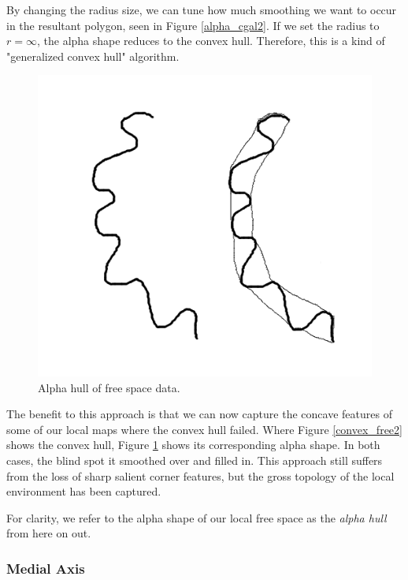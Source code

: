 By changing the radius size, we can tune how much smoothing we want to occur in the resultant polygon, seen in Figure \ref{alpha_cgal2}.  If we set the radius to $r = \infty$, the alpha shape reduces to the convex hull.  Therefore, this is a kind of "generalized convex hull" algorithm.

\begin{figure}
  \begin{center}
    \includegraphics[scale=0.9]{4_alpha_freespace2.png}
  \end{center}
  \caption{Alpha hull of free space data.}
	\label{alpha_free2}
\end{figure}

The benefit to this approach is that we can now capture the concave features of some of our local maps where the convex hull failed.  Where Figure \ref{convex_free2} shows the convex hull, Figure \ref{alpha_free2} shows its corresponding alpha shape.  In both cases, the blind spot it smoothed over and filled in.  This approach still suffers from the loss of sharp salient corner features, but the gross topology of the local environment has been captured.

For clarity, we refer to the alpha shape of our local free space as the \emph{alpha hull} from here on out.


\subsubsection{Medial Axis}

